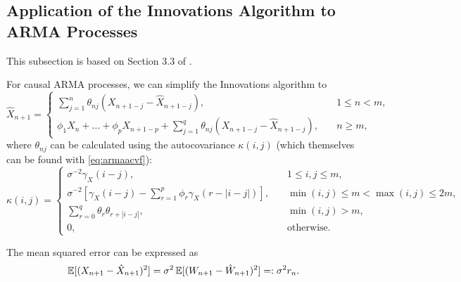 \documentclass[a4paper, oneside]{discothesis}
\begin{document}
\subsection{Application of the Innovations Algorithm to ARMA Processes}
This subsection is based on Section 3.3 of \cite{itsf}.

For causal ARMA processes, we can simplify the Innovations algorithm to
    \begin{equation*}
        \hat{X}_{n+1} = 
        \begin{cases}
            \sum_{j=1}^n \theta_{nj} \left(X_{n+1-j} - \hat{X}_{n+1-j}\right), \quad & 1 \leq n < m, \\
            \phi_1 X_n + \dots + \phi_p X_{n+1-p} + \sum_{j=1}^q \theta_{nj} \left(X_{n+1-j} - \hat{X}_{n+1-j}\right), \quad & n \geq m,
        \end{cases}
    \end{equation*}
where $\theta_{nj}$ can be calculated using the autocovariance $\kappa(i,j)$ (which themselves can be found with \eqref{eq:armaacvf}):
\begin{equation*}
    \kappa(i, j) =
    \begin{cases}
        \sigma^{-2} \gamma_X(i-j), \quad & 1 \leq i, j \leq m, \\
        \sigma^{-2}[\gamma_X(i-j) - \sum_{r=1}^p \phi_r \gamma_X (r-|i-j|)], \quad & \min(i, j) \leq m < \max(i, j) \leq 2m, \\
        \sum_{r=0}^q \theta_r \theta_{r+|i-j|}, \quad & \min(i, j) > m, \\
        0, \quad & \text{otherwise.}
    \end{cases}
\end{equation*}

The mean squared error can be expressed as
\begin{equation} \label{eq:innov_r_n}
    \operatorname{\mathbb{E}}[(X_{n+1}-\hat{X}_{n+1})^2] = \sigma^2\operatorname{\mathbb{E}}[(W_{n+1}-\hat{W}_{n+1})^2] =: \sigma^2 r_n.
\end{equation}
\end{document}
